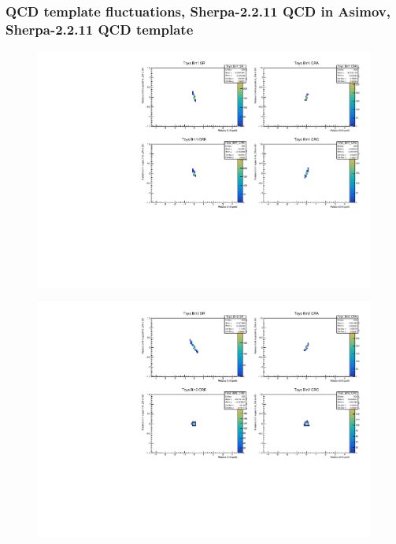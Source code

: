 \subsubsection{\mjj QCD template fluctuations, Sherpa-2.2.11 QCD in Asimov, Sherpa-2.2.11 QCD template}
\begin{figure}[H]
\includegraphics[width=\textwidth]{plots/diffx/instab/linearfx/instabilities_mjj_QCD_Sh2211_Signal_Sh2211_BSMCQCDSTATS_linearfx_newbinning_sherpaasimov_bin1.pdf}
\end{figure}
\begin{figure}[H]
\includegraphics[width=\textwidth]{plots/diffx/instab/linearfx/instabilities_mjj_QCD_Sh2211_Signal_Sh2211_BSMCQCDSTATS_linearfx_newbinning_sherpaasimov_bin2.pdf}
\end{figure}
